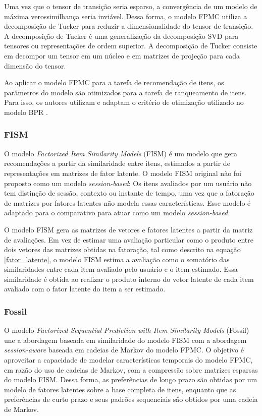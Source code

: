Uma vez que o tensor de transição seria esparso, a convergência de um modelo de
máxima verossimilhança seria inviável. Dessa forma, o modelo FPMC utiliza a
decomposição de Tucker para reduzir a dimensionalidade do tensor de transição. A
decomposição de Tucker é uma generalização da decomposição SVD para tensores ou
representações de ordem superior. A decomposição de Tucker consiste em decompor
um tensor em um núcleo e em matrizes de projeção para cada dimensão do tensor.

Ao aplicar o modelo FPMC para a tarefa de recomendação de itens, os parâmetros
do modelo são otimizados para a tarefa de ranqueamento de itens. Para isso, os
autores utilizam e adaptam o critério de otimização utilizado no modelo BPR
\cite{rendle2009}.

\subsubsection{FISM}
 O modelo
\textit{Factorized Item Similarity Models} (FISM) \cite{kabbur2013fism} é um
modelo que gera recomendações a partir da similaridade entre itens, estimados a
partir de representações em matrizes de fator latente. O modelo FISM original
não foi proposto como um modelo \textit{session-based}: Os itens avaliados por
um usuário não tem distinção de sessão, contexto ou instante de tempo, uma vez
que a fatoração de matrizes por fatores latentes não modela essas
características. Esse modelo é adaptado para o comparativo
para atuar como um modelo \textit{session-based}.

O modelo FISM gera as matrizes de vetores e fatores latentes a partir da matriz
de avaliações. Em vez de estimar uma avaliação particular como o produto entre
dois vetores das matrizes obtidas na fatoração, tal como descrito na equação
\ref{fator_latente}, o modelo FISM estima a avaliação como o somatório das
similaridades entre cada item avaliado pelo usuário e o item estimado. Essa
similaridade é obtida ao realizar o produto interno do vetor latente de cada
item avaliado com o fator latente do item a ser estimado.

\subsubsection{Fossil}
O modelo \textit{Factorized Sequential Prediction with Item Similarity Models}
(Fossil) \cite{fossil} une a abordagem baseada em similaridade do modelo FISM com a abordagem
\textit{session-aware} baseada em cadeias de Markov do modelo FPMC. O objetivo é
aproveitar a capacidade de modelar características temporais do modelo FPMC, em
razão do uso de cadeias de Markov, com a compressão sobre matrizes esparsas do
modelo FISM. Dessa forma, as preferências de longo prazo são obtidas por um
modelo de fatores latentes sobre a base completa de itens, enquanto que as
preferências de curto prazo e seus padrões sequenciais são obtidos por uma
cadeia de Markov.

